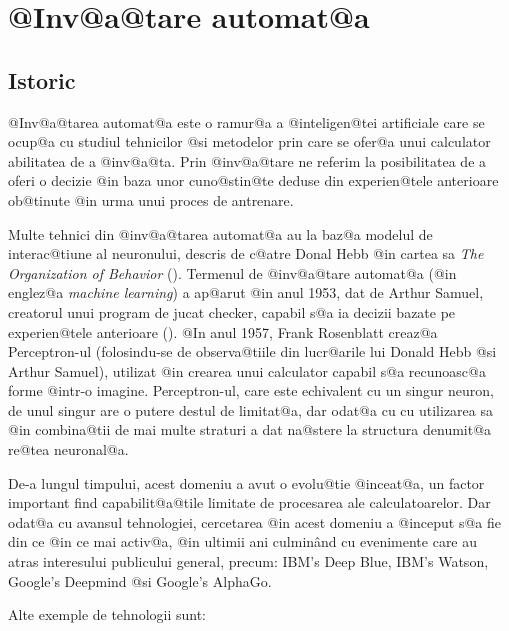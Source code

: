 \chapter{ @Inv@a@tare automat@a }

\section{Istoric}


	@Inv@a@tarea automat@a este o ramur@a a @inteligen@tei artificiale care se ocup@a cu studiul tehnicilor @si metodelor prin care se ofer@a unui calculator abilitatea de a @inv@a@ta. Prin @inv@a@tare ne referim la posibilitatea de a oferi o decizie @in baza unor cuno@stin@te deduse din experien@tele anterioare ob@tinute @in urma unui proces de antrenare.

 Multe tehnici din @inv@a@tarea automat@a au la baz@a modelul de interac@tiune al neuronului, descris de c@atre Donal Hebb @in cartea sa {\sl The Organization of Behavior} (\cite{donald-hebb-book}). Termenul de @inv@a@tare automat@a (@in englez@a {\sl machine learning}) a ap@arut @in anul 1953, dat de Arthur Samuel, creatorul unui program de jucat checker, capabil s@a ia decizii bazate pe experien@tele anterioare (\cite{arthur-samuel}). @In anul 1957, Frank Rosenblatt creaz@a Perceptron-ul (folosindu-se de observa@tiile din lucr@arile lui Donald Hebb @si Arthur Samuel), utilizat @in crearea unui calculator capabil s@a recunoasc@a forme @intr-o imagine. Perceptron-ul, care este echivalent cu un singur neuron, de unul singur are o putere destul de limitat@a, dar odat@a cu cu  utilizarea sa @in combina@tii de mai multe straturi a dat na@stere la structura denumit@a re@tea neuronal@a. 
 
 De-a lungul timpului, acest domeniu a avut o evolu@tie @inceat@a, un factor important find capabilit@a@tile limitate de procesarea ale calculatoarelor. Dar odat@a cu avansul tehnologiei, cercetarea @in acest domeniu a @inceput s@a fie din ce @in ce mai activ@a, @in ultimii ani culmin\^ and cu evenimente care au atras interesului publicului general, precum: IBM's Deep Blue, IBM's Watson, Google's Deepmind @si Google's AlphaGo.

Alte exemple de tehnologii sunt:

